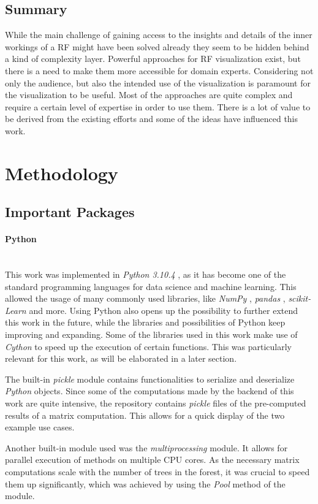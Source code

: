 \documentclass[a4paper, 12pt]{article}
\begin{document}
\subsection{Summary}
While the main challenge of gaining access to the insights and details of the inner workings
of a RF might have been solved already they seem to be hidden behind a kind of complexity
layer. Powerful approaches for RF visualization exist, but there is a need to make them more
accessible for domain experts. Considering not only the audience, but also the intended
use of the visualization is paramount for the visualization to be useful. Most of the
approaches are quite complex and require a certain level of expertise in order to use them.
There is a lot of value to be derived from the existing efforts and some of the ideas have
influenced this work.

\section{Methodology}
\subsection {Important Packages}
\paragraph{Python}\mbox{}\\
This work was implemented in \textit{Python 3.10.4} \cite{10.5555/1593511}, as it has
become one of the standard programming languages for data science and machine learning.
This allowed the usage of many commonly used libraries, like \textit{NumPy} \cite{harris2020array},
\textit{pandas} \cite{mckinney-proc-scipy-2010}, \textit{scikit-Learn} \cite{scikit-learn} and more.
Using Python also opens up the possibility to further extend this work in the future, while
the libraries and possibilities of Python keep improving and expanding.
Some of the libraries used in this work make use of \textit{Cython} \cite{behnel2011cython} to
speed up the execution of certain functions. This was particularly relevant for this work, as will
be elaborated in a later section. \par
The built-in \textit{pickle} module contains functionalities to serialize and deserialize
\textit{Python} objects.
Since some of the computations made by the backend of this work are quite intensive, the repository
contains \textit{pickle} files of the pre-computed results of a matrix computation. This allows
for a quick display of the two example use cases. \par
Another built-in module used was the \textit{multiprocessing} module. It allows for parallel
execution of methods on multiple CPU cores. As the necessary matrix computations scale with the
number of trees in the forest, it was crucial to speed them up significantly, which was achieved
by using the \textit{Pool} method of the module.
\end{document}
